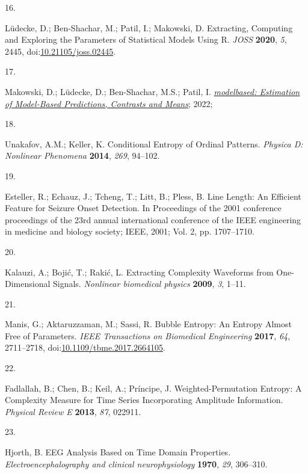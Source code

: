 \documentclass[
  man]{apa6}
\newlength{\cslhangindent}
\newlength{\csllabelwidth}
\newlength{\cslentryspacingunit} %
\newenvironment{CSLReferences}[2] %
 {%
  \setlength{\parindent}{0pt}
  \ifodd #1
  \let\oldpar\par
  \def\par{\hangindent=\cslhangindent\oldpar}
  \fi
  \setlength{\parskip}{#2\cslentryspacingunit}
 }%
 {}
\newcommand{\CSLLeftMargin}[1]{\parbox[t]{\csllabelwidth}{#1}}
\newcommand{\CSLRightInline}[1]{\parbox[t]{\linewidth - \csllabelwidth}{#1}\break}
\begin{document}
\begin{CSLReferences}{0}{0}
\leavevmode{}%
\CSLLeftMargin{16. }%
\CSLRightInline{Lüdecke, D.; Ben-Shachar, M.; Patil, I.; Makowski, D. Extracting, Computing and Exploring the Parameters of Statistical Models Using {R}. \emph{JOSS} \textbf{2020}, \emph{5}, 2445, doi:\href{https://doi.org/10.21105/joss.02445}{10.21105/joss.02445}.}

\leavevmode{}%
\CSLLeftMargin{17. }%
\CSLRightInline{Makowski, D.; Lüdecke, D.; Ben-Shachar, M.S.; Patil, I. \emph{\href{https://CRAN.R-project.org/package=modelbased}{{modelbased}: Estimation of Model-Based Predictions, Contrasts and Means}}; 2022;}

\leavevmode{}%
\CSLLeftMargin{18. }%
\CSLRightInline{Unakafov, A.M.; Keller, K. Conditional Entropy of Ordinal Patterns. \emph{Physica D: Nonlinear Phenomena} \textbf{2014}, \emph{269}, 94--102.}

\leavevmode{}%
\CSLLeftMargin{19. }%
\CSLRightInline{Esteller, R.; Echauz, J.; Tcheng, T.; Litt, B.; Pless, B. Line Length: An Efficient Feature for Seizure Onset Detection. In Proceedings of the 2001 conference proceedings of the 23rd annual international conference of the IEEE engineering in medicine and biology society; IEEE, 2001; Vol. 2, pp. 1707--1710.}

\leavevmode{}%
\CSLLeftMargin{20. }%
\CSLRightInline{Kalauzi, A.; Bojić, T.; Rakić, L. Extracting Complexity Waveforms from One-Dimensional Signals. \emph{Nonlinear biomedical physics} \textbf{2009}, \emph{3}, 1--11.}

\leavevmode{}%
\CSLLeftMargin{21. }%
\CSLRightInline{Manis, G.; Aktaruzzaman, M.; Sassi, R. Bubble Entropy: An Entropy Almost Free of Parameters. \emph{IEEE Transactions on Biomedical Engineering} \textbf{2017}, \emph{64}, 2711--2718, doi:\href{https://doi.org/10.1109/tbme.2017.2664105}{10.1109/tbme.2017.2664105}.}

\leavevmode{}%
\CSLLeftMargin{22. }%
\CSLRightInline{Fadlallah, B.; Chen, B.; Keil, A.; Príncipe, J. Weighted-Permutation Entropy: A Complexity Measure for Time Series Incorporating Amplitude Information. \emph{Physical Review E} \textbf{2013}, \emph{87}, 022911.}

\leavevmode{}%
\CSLLeftMargin{23. }%
\CSLRightInline{Hjorth, B. EEG Analysis Based on Time Domain Properties. \emph{Electroencephalography and clinical neurophysiology} \textbf{1970}, \emph{29}, 306--310.}


\end{CSLReferences}
\end{document}

